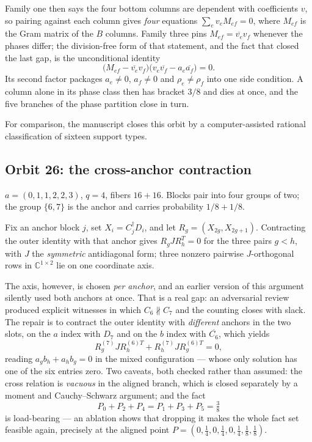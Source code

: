\documentclass[11pt,a4paper]{article}
\newcommand{\CC}{\mathbb{C}}
\theoremstyle{definition}
\begin{document}
Family one then says the four bottom columns are dependent with coefficients
$v$, so pairing against each column gives \emph{four} equations
$\sum_e v_e M_{ef} = 0$, where $M_{ef}$ is the Gram matrix of the $B$ columns.
Family three pins $M_{ef} = \overline{v_e} v_f$ whenever the phases differ; the
division-free form of that statement, and the fact that closed the last gap, is
the unconditional identity
\[
  \bigl(M_{ef} - \overline{v_e} v_f\bigr)
  \bigl(v_e \overline{v_f} - a_e \overline{a_f}\bigr) = 0 .
\]
Its second factor packages $a_e \ne 0$, $a_f \ne 0$ and $\rho_e \ne \rho_f$ into
one side condition. A column alone in its phase class then has bracket $3/8$ and
dies at once, and the five branches of the phase partition close in turn.

For comparison, the manuscript closes this orbit by a computer-assisted rational
classification of sixteen support types.

\subsection{Orbit 26: the cross-anchor contraction}

$a = (0,1,1,2,2,3)$, $q = 4$, fibers $16+16$. Blocks pair into four groups of
two; the group $\{6,7\}$ is the anchor and carries probability $1/8 + 1/8$.

Fix an anchor block $j$, set $X_i = C_j^\dagger D_i$, and let
$R_g = (X_{2g}, X_{2g+1})$. Contracting the outer identity with that anchor gives
$R_g J R_h^T = 0$ for the three pairs $g < h$, with $J$ the \emph{symmetric}
antidiagonal form; three nonzero pairwise $J$-orthogonal rows in $\CC^{1\times 2}$
lie on one coordinate axis.

The axis, however, is chosen \emph{per anchor}, and an earlier version of this
argument silently used both anchors at once. That is a real gap: an adversarial
review produced explicit witnesses in which $C_6 \not\parallel C_7$ and the
counting closes with slack. The repair is to contract the outer identity with
\emph{different} anchors in the two slots, on the $a$ index with $D_7$ and on the
$b$ index with $\overline{C_6}$, which yields
\[
  R_g^{(7)} J R_h^{(6)T} + R_h^{(7)} J R_g^{(6)T} = 0 ,
\]
reading $a_g b_h + a_h b_g = 0$ in the mixed configuration --- whose only
solution has one of the six entries zero. Two caveats, both checked rather than
assumed: the cross relation is \emph{vacuous} in the aligned branch, which is
closed separately by a moment and Cauchy--Schwarz argument; and the fact
\[
  P_0 + P_2 + P_4 = P_1 + P_3 + P_5 = \tfrac38
\]
is load-bearing --- an ablation shows that dropping it makes the whole fact set
feasible again, precisely at the aligned point
$P = (0,\tfrac14,0,\tfrac14,0,\tfrac14,\tfrac18,\tfrac18)$.
\end{document}

